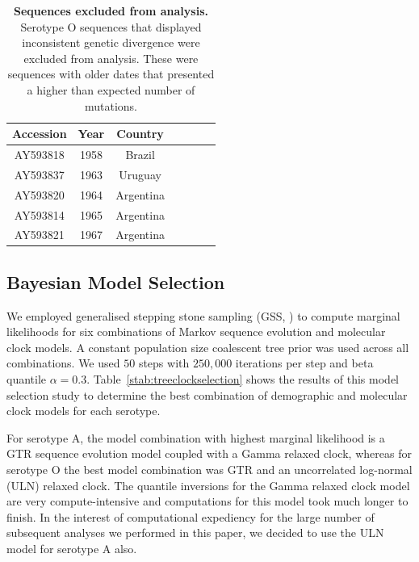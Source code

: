 \documentclass[a4paper,10pt]{article}
\begin{document}
\begin{table}[H]
\caption{\textbf{Sequences excluded from analysis.}
Serotype O sequences that displayed inconsistent genetic divergence were excluded from analysis.
These were sequences with older dates that presented a higher than expected number of mutations.
}
\begin{center}
\begin{tabular}{ccccccc}
\toprule
Accession & Year & Country \\      
\midrule
AY593818 & 1958 & Brazil \\
AY593837 & 1963 & Uruguay \\ 
AY593820 & 1964 & Argentina  \\
AY593814 & 1965 & Argentina \\
AY593821 & 1967 & Argentina \\
\bottomrule
\end{tabular}
\end{center}
\begin{flushleft}
\end{flushleft}
\label{stab:exclseqs}
 \end{table}

 
\subsection*{Bayesian Model Selection}

We employed generalised stepping stone sampling (GSS, \cite{M-Baele2015}) to compute marginal likelihoods for six combinations of Markov sequence evolution and molecular clock models.
A constant population size coalescent tree prior was used across all combinations.
We used $50$ steps with $250, 000$ iterations per step and beta quantile $\alpha = 0.3$.
Table~\ref{stab:treeclockselection} shows the results of this model selection study to determine the best combination of demographic and molecular clock models for each serotype.

For serotype A, the model combination with highest marginal likelihood is a GTR sequence evolution model coupled with a Gamma relaxed clock, whereas for serotype O the best model combination was GTR and an uncorrelated log-normal (ULN) relaxed clock.
The quantile inversions for the Gamma relaxed clock model are very compute-intensive and computations for this model took much longer to finish.
In the interest of computational  expediency for the large number of subsequent analyses we performed in this paper, we decided to use the ULN model for serotype A also.
\end{document}
